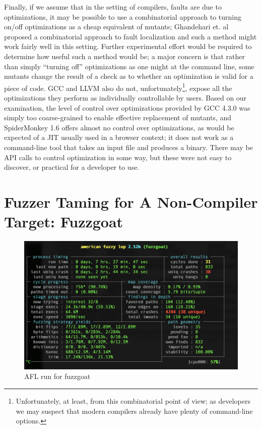 Finally, if we assume that in the setting of compilers, faults are due to optimizations, it may be possible to use a combinatorial approach to turning on/off optimizations as a cheap equivalent of mutants; Ghandehari et. al \cite{CombTestFaultLoc} proposed a combinatorial approach to fault localization and such a method might work fairly well in this setting.  Further experimental effort would be required to determine how useful such a method would be; a major concern is that rather than simply ``turning off'' optimizations as one might at the command line, some mutants change the result of a check as to whether an optimization is valid for a piece of code.  GCC and LLVM also do not, unfortunately\footnote{Unfortunately, at least, from this combinatorial point of view; as developers we may suspect that modern compilers already have plenty of command-line options.}, expose all the optimizations they perform as individually controllable by users.  Based on our examination, the level of control over optimizations provided by GCC 4.3.0 was simply too coarse-grained to enable effective replacement of mutants, and SpiderMonkey 1.6 offers almost no control over optimizations, as would be expected of a JIT usually used in a browser context; it does not work as a command-line tool that takes an input file and produces a binary.  There may be API calls to control optimization in some way, but these were not easy to discover, or practical for a developer to use.

\section{Fuzzer Taming for A Non-Compiler Target: Fuzzgoat}
\label{fuzzgoat}

\begin{figure}
   \centering
        \includegraphics[width=1.0\textwidth]{afl_fuzzgoat.png}
        \caption{AFL run for fuzzgoat}
        \label{aflfuzzgoat}  
  \end{figure}

